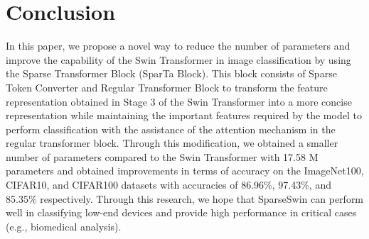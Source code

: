 \documentclass[runningheads]{llncs}
\begin{document}
\begin{table}[bp]
\extracolsep{\fill}
\def\arraystretch{1.25}\centering
\large
\caption{Quantitative Comparison on CIFAR100}
\label{tab:cifar100}
\end{table}


\section{Conclusion}
\label{sec:conclusion}
In this paper, we propose a novel way to reduce the number of parameters and improve the capability of the Swin Transformer in image classification by using the Sparse Transformer Block (SparTa Block). This block consists of Sparse Token Converter and Regular Transformer Block to transform the feature representation obtained in Stage 3 of the Swin Transformer into a more concise representation while maintaining the important features required by the model to perform classification with the assistance of the attention mechanism in the regular transformer block. Through this modification, we obtained a smaller number of parameters compared to the Swin Transformer with 17.58 M parameters and obtained improvements in terms of accuracy on the ImageNet100, CIFAR10, and CIFAR100 datasets with accuracies of 86.96\%, 97.43\%, and 85.35\% respectively. Through this research, we hope that SparseSwin can perform well in classifying low-end devices and provide high performance in critical cases (e.g., biomedical analysis).



 
\end{document}
